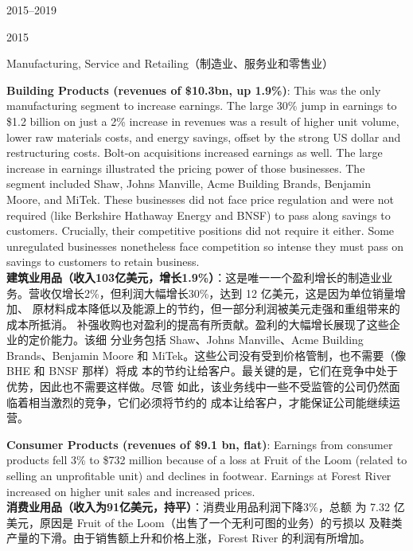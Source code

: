 \begin{chapter}{2015--2019}
\begin{section}{2015}
\begin{subsection}{Manufacturing, Service and Retailing（制造业、服务业和零售业）}
\begin{verseparallel}
  {
    \textbf{Building Products (revenues of \$10.3bn, up 1.9\%)}: This was the
    only manufacturing segment to increase earnings. The large 30\% jump in
    earnings to \$1.2 billion on just a 2\% increase in revenues was a result of
    higher unit volume, lower raw materials costs, and energy savings, offset by
    the strong US dollar and restructuring costs. Bolt-on acquisitions increased
    earnings as well. The large increase in earnings illustrated the pricing
    power of those businesses. The segment included Shaw, Johns Manville, Acme
    Building Brands, Benjamin Moore, and MiTek. These businesses did not face
    price regulation and were not required (like Berkshire Hathaway Energy and
    BNSF) to pass along savings to customers. Crucially, their competitive
    positions did not require it either. Some unregulated businesses nonetheless
    face competition so intense they must pass on savings to customers to retain
    business. \\
  }
  {
    \textbf{建筑业用品（收入103亿美元，增长1.9\%）}：这是唯一一个盈利增长的制造业业
    务。营收仅增长2\%，但利润大幅增长30\%，达到 12 亿美元，这是因为单位销量增加、
    原材料成本降低以及能源上的节约，但一部分利润被美元走强和重组带来的成本所抵消。
    补强收购也对盈利的提高有所贡献。盈利的大幅增长展现了这些企业的定价能力。该细
    分业务包括 Shaw、Johns Manville、Acme Building Brands、Benjamin
    Moore 和 MiTek。这些公司没有受到价格管制，也不需要（像 BHE 和 BNSF 那样）将成
    本的节约让给客户。最关键的是，它们在竞争中处于优势，因此也不需要这样做。尽管
    如此，该业务线中一些不受监管的公司仍然面临着相当激烈的竞争，它们必须将节约的
    成本让给客户，才能保证公司能继续运营。
  }
\end{verseparallel}

\begin{verseparallel}
  {
    \textbf{Consumer Products (revenues of \$9.1 bn, flat)}: Earnings from
    consumer products fell 3\% to \$732 million because of a loss at Fruit of
    the Loom (related to selling an unprofitable unit) and declines in footwear.
    Earnings at Forest River increased on higher unit sales and increased
    prices. \\
  }
  {
    \textbf{消费业用品（收入为91亿美元，持平）}：消费业用品利润下降3\%，总额
    为 7.32 亿美元，原因是 Fruit of the Loom（出售了一个无利可图的业务）的亏损以
    及鞋类产量的下滑。由于销售额上升和价格上涨，Forest River 的利润有所增加。
  }
\end{verseparallel}


\end{subsection}
\end{section}
\end{chapter}
